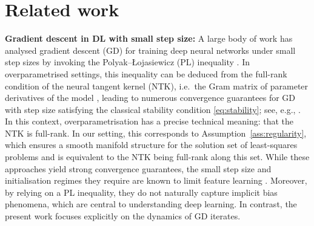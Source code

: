 \documentclass{article}
\theoremstyle{plain}
\theoremstyle{definition}
\theoremstyle{remark}
\begin{document}
\section{Related work}

\textbf{Gradient descent in DL with small step size:} 
A large body of work has analysed gradient descent (GD) for training deep neural networks under small step sizes by invoking the Polyak--Łojasiewicz (PL) inequality \cite{pl}. In overparametrised settings, this inequality can be deduced from the full-rank condition of the neural tangent kernel (NTK), i.e.\ the Gram matrix of parameter derivatives of the model \cite{jacot}, leading to numerous convergence guarantees for GD with step size satisfying the classical stability condition \eqref{eq:stability}; see, e.g., \cite{zhu, du1, du2, leewide, nguyen1, nguyen2, nguyen3, bombari}. In this context, overparametrisation has a precise technical meaning: that the NTK is full-rank. In our setting, this corresponds to Assumption~\ref{ass:regularity}, which ensures a smooth manifold structure for the solution set of least-squares problems and is equivalent to the NTK being full-rank along this set. While these approaches yield strong convergence guarantees, the small step size and initialisation regimes they require are known to limit feature learning \cite{chizat1}. Moreover, by relying on a PL inequality, they do not naturally capture implicit bias phenomena, which are central to understanding deep learning. In contrast, the present work focuses explicitly on the dynamics of GD iterates.
\end{document}
